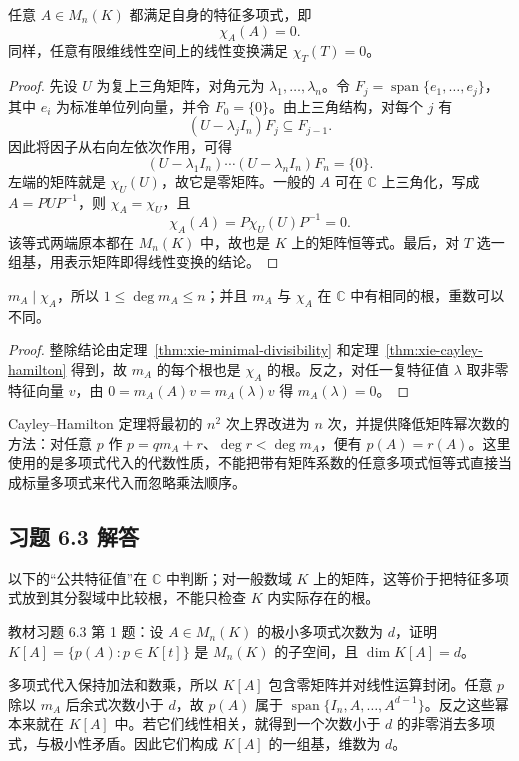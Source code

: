 \begin{theorem}
\label{thm:xie-cayley-hamilton}
任意 $A\in M_n(K)$ 都满足自身的特征多项式，即
\begin{equation}
\label{eq:xie-cayley-hamilton}
 \chi_A(A)=0.
\end{equation}
同样，任意有限维线性空间上的线性变换满足 $\chi_T(T)=0$。
\end{theorem}
\begin{proof}
先设 $U$ 为复上三角矩阵，对角元为 $\lambda_1,\ldots,\lambda_n$。令 $F_j=\operatorname{span}\{e_1,\ldots,e_j\}$，其中 $e_i$ 为标准单位列向量，并令 $F_0=\{0\}$。由上三角结构，对每个 $j$ 有
\[
 (U-\lambda_jI_n)F_j\subseteq F_{j-1}.
\]
因此将因子从右向左依次作用，可得
\[
 (U-\lambda_1I_n)\cdots(U-\lambda_nI_n)F_n=\{0\}.
\]
左端的矩阵就是 $\chi_U(U)$，故它是零矩阵。一般的 $A$ 可在 $\mathbb C$ 上三角化，写成 $A=PUP^{-1}$，则 $\chi_A=\chi_U$，且
\[
 \chi_A(A)=P\chi_U(U)P^{-1}=0.
\]
该等式两端原本都在 $M_n(K)$ 中，故也是 $K$ 上的矩阵恒等式。最后，对 $T$ 选一组基，用表示矩阵即得线性变换的结论。
\end{proof}

\begin{corollary}
\label{cor:xie-minimal-characteristic}
$m_A\mid\chi_A$，所以 $1\leq\deg m_A\leq n$；并且 $m_A$ 与 $\chi_A$ 在 $\mathbb C$ 中有相同的根，重数可以不同。
\end{corollary}
\begin{proof}
整除结论由定理~\ref{thm:xie-minimal-divisibility} 和定理~\ref{thm:xie-cayley-hamilton} 得到，故 $m_A$ 的每个根也是 $\chi_A$ 的根。反之，对任一复特征值 $\lambda$ 取非零特征向量 $v$，由 $0=m_A(A)v=m_A(\lambda)v$ 得 $m_A(\lambda)=0$。
\end{proof}

Cayley--Hamilton 定理将最初的 $n^2$ 次上界改进为 $n$ 次，并提供降低矩阵幂次数的方法：对任意 $p$ 作 $p=qm_A+r$、$\deg r<\deg m_A$，便有 $p(A)=r(A)$。这里使用的是多项式代入的代数性质，不能把带有矩阵系数的任意多项式恒等式直接当成标量多项式来代入而忽略乘法顺序。


\subsection{习题 6.3 解答}
\label{subsec:xie-exercises-63}

以下的“公共特征值”在 $\mathbb C$ 中判断；对一般数域 $K$ 上的矩阵，这等价于把特征多项式放到其分裂域中比较根，不能只检查 $K$ 内实际存在的根。

\begin{example}
\label{ex:xie-63-01}
教材习题 6.3 第 1 题：设 $A\in M_n(K)$ 的极小多项式次数为 $d$，证明 $K[A]=\{p(A):p\in K[t]\}$ 是 $M_n(K)$ 的子空间，且 $\dim K[A]=d$。
\end{example}
\begin{solve}
多项式代入保持加法和数乘，所以 $K[A]$ 包含零矩阵并对线性运算封闭。任意 $p$ 除以 $m_A$ 后余式次数小于 $d$，故 $p(A)$ 属于 $\operatorname{span}\{I_n,A,\ldots,A^{d-1}\}$。反之这些幂本来就在 $K[A]$ 中。若它们线性相关，就得到一个次数小于 $d$ 的非零消去多项式，与极小性矛盾。因此它们构成 $K[A]$ 的一组基，维数为 $d$。
\end{solve}

